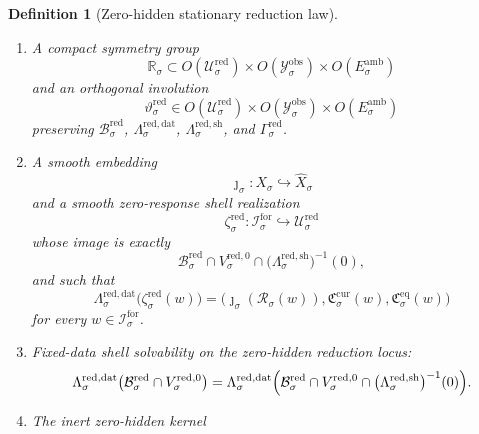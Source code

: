 \documentclass[11pt]{article}
\newcommand{\ForSpace}[1]{\mathcal I_{#1}^{\mathrm{for}}}
\newcommand{\Reduction}[1]{\mathcal R_{#1}}
\newcommand{\CurrentCarrier}[1]{\mathfrak C_{#1}^{\mathrm{cur}}}
\newcommand{\EqCarrier}[1]{\mathfrak C_{#1}^{\mathrm{eq}}}
\newcommand{\VisibleAffine}[1]{\widehat X_{#1}}
\newcommand{\DataSpace}[1]{\mathcal Y_{#1}^{\mathrm{obs}}}
\newcommand{\AmbientTarget}[1]{E_{#1}^{\mathrm{amb}}}
\newcommand{\RedSpace}[1]{\mathcal U_{#1}^{\mathrm{red}}}
\newcommand{\RedBody}[1]{\mathcal B_{#1}^{\mathrm{red}}}
\newcommand{\RedData}[1]{\Lambda_{#1}^{\mathrm{red,dat}}}
\newcommand{\RedShell}[1]{\Lambda_{#1}^{\mathrm{red,sh}}}
\newcommand{\RedTarget}[1]{F_{#1}^{\mathrm{red}}}
\newcommand{\RedMap}[1]{\Gamma_{#1}^{\mathrm{red}}}
\newcommand{\RedZero}[1]{V_{#1}^{\mathrm{red},0}}
\newcommand{\RedHidden}[1]{H_{#1}^{\mathrm{red}}}
\newcommand{\RedLin}[1]{\mathcal M_{#1}^{\mathrm{red}}}
\newcommand{\RedSym}[1]{\mathbb R_{#1}}
\newcommand{\RedTime}[1]{\vartheta_{#1}^{\mathrm{red}}}
\newcommand{\RedEmbed}[1]{\zeta_{#1}^{\mathrm{red}}}
\newtheorem{definition}{Definition}
\begin{document}
\begin{definition}[Zero-hidden stationary reduction law]
\begin{enumerate}
\begin{equation}
    D\RedMap{\sigma}(z)=\RedLin{\sigma}.
    \label{eq:redlinearization}
    \end{equation}
    Assume moreover that
    \begin{equation}
    \RedLin{\sigma}(\delta z)=0
    \qquad
    \text{for all }\delta z\in\RedZero{\sigma},
    \label{eq:redzero}
    \end{equation}
    and that there exists \(\lambda_{\sigma}^{\mathrm{red}}>0\) with
    \begin{equation}
    \|\RedLin{\sigma}\eta\|_{\RedTarget{\sigma}}^{2}
    \ge
    \lambda_{\sigma}^{\mathrm{red}}\,
    \|\eta\|^{2}
    \qquad
    \text{for all }\eta\in\RedHidden{\sigma}.
    \label{eq:redgap}
    \end{equation}
    \item A compact symmetry group
    \[
    \RedSym{\sigma}\subset
    O(\RedSpace{\sigma})\times
    O(\DataSpace{\sigma})\times
    O(\AmbientTarget{\sigma})
    \]
    and an orthogonal involution
    \[
    \RedTime{\sigma}\in
    O(\RedSpace{\sigma})\times
    O(\DataSpace{\sigma})\times
    O(\AmbientTarget{\sigma})
    \]
    preserving \(\RedBody{\sigma}\), \(\RedData{\sigma}\), \(\RedShell{\sigma}\), and \(\RedMap{\sigma}\).
    \item A smooth embedding
    \[
    \jmath_{\sigma}:X_{\sigma}\hookrightarrow\VisibleAffine{\sigma}
    \]
    and a smooth zero-response shell realization
    \[
    \RedEmbed{\sigma}:\ForSpace{\sigma}\hookrightarrow\RedSpace{\sigma}
    \]
    whose image is exactly
    \[
    \RedBody{\sigma}\cap
    \RedZero{\sigma}\cap
    \bigl(\RedShell{\sigma}\bigr)^{-1}(0),
    \]
    and such that
    \begin{equation}
    \RedData{\sigma}\bigl(\RedEmbed{\sigma}(w)\bigr)
    =
    \bigl(
    \jmath_{\sigma}(\Reduction{\sigma}(w)),
    \CurrentCarrier{\sigma}(w),
    \EqCarrier{\sigma}(w)
    \bigr)
    \label{eq:redcompat}
    \end{equation}
    for every \(w\in\ForSpace{\sigma}\).
    \item Fixed-data shell solvability on the zero-hidden reduction locus:
    \begin{equation}
    \RedData{\sigma}\bigl(
    \RedBody{\sigma}\cap\RedZero{\sigma}
    \bigr)
    =
    \RedData{\sigma}\Bigl(
    \RedBody{\sigma}\cap
    \RedZero{\sigma}\cap
    \bigl(\RedShell{\sigma}\bigr)^{-1}(0)
    \Bigr).
    \label{eq:redsolvability}
    \end{equation}
    \item The inert zero-hidden kernel

\end{enumerate}
\end{definition}
\end{document}
